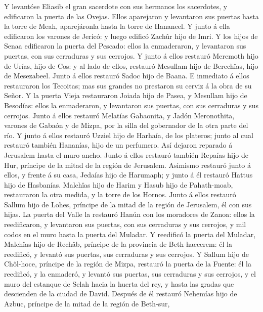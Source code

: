  Y levantóse Eliasib el gran sacerdote con sus hermanos los
sacerdotes, y edificaron la puerta de las Ovejas. Ellos aparejaron y
levantaron sus puertas hasta la torre de Meah, aparejáronla hasta la
torre de Hananeel.  Y junto á ella edificaron los varones de
Jericó: y luego edificó Zachûr hijo de Imri.  Y los hijos de
Senaa edificaron la puerta del Pescado: ellos la enmaderaron, y
levantaron sus puertas, con sus cerraduras y sus cerrojos. 
Y junto á ellos restauró Meremoth hijo de Urías, hijo de Cos: y al lado
de ellos, restauró Mesullam hijo de Berechîas, hijo de Mesezabeel. Junto
á ellos restauró Sadoc hijo de Baana.  E inmediato á ellos
restauraron los Tecoitas; mas sus grandes no prestaron su cerviz á la
obra de su Señor.  Y la puerta Vieja restauraron Joiada hijo
de Pasea, y Mesullam hijo de Besodías: ellos la enmaderaron, y
levantaron sus puertas, con sus cerraduras y sus cerrojos. 
Junto á ellos restauró Melatías Gabaonita, y Jadón Meronothita, varones
de Gabaón y de Mizpa, por la silla del gobernador de la otra parte del
río.  Y junto á ellos restauró Uzziel hijo de Harhaía, de
los plateros; junto al cual restauró también Hananías, hijo de un
perfumero. Así dejaron reparado á Jerusalem hasta el muro ancho.
 Junto á ellos restauró también Repaías hijo de Hur,
príncipe de la mitad de la región de Jerusalem.  Asimismo
restauró junto á ellos, y frente á su casa, Jedaías hijo de Harumaph; y
junto á él restauró Hattus hijo de Hasbanías.  Malchîas
hijo de Harim y Hasub hijo de Pahath-moab, restauraron la otra medida, y
la torre de los Hornos.  Junto á ellos restauró Sallum hijo
de Lohes, príncipe de la mitad de la región de Jerusalem, él con sus
hijas.  La puerta del Valle la restauró Hanún con los
moradores de Zanoa: ellos la reedificaron, y levantaron sus puertas, con
sus cerraduras y sus cerrojos, y mil codos en el muro hasta la puerta
del Muladar.  Y reedificó la puerta del Muladar, Malchîas
hijo de Rechâb, príncipe de la provincia de Beth-haccerem: él la
reedificó, y levantó sus puertas, sus cerraduras y sus cerrojos.
 Y Sallum hijo de Chôl-hoce, príncipe de la región de
Mizpa, restauró la puerta de la Fuente: él la reedificó, y la enmaderó,
y levantó sus puertas, sus cerraduras y sus cerrojos, y el muro del
estanque de Selah hacia la huerta del rey, y hasta las gradas que
descienden de la ciudad de David.  Después de él restauró
Nehemías hijo de Azbuc, príncipe de la mitad de la región de Beth-sur,
